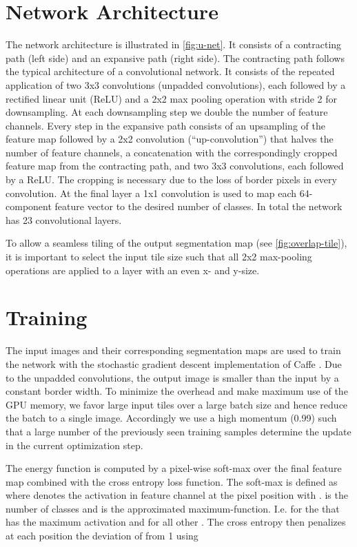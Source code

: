 \documentclass{llncs}
\begin{document}
\section{Network Architecture}
The network architecture is illustrated in \autoref{fig:u-net}. It consists of a contracting path (left side) and an expansive path (right side). The contracting path follows the typical architecture of a convolutional network. It consists of the repeated application of two 3x3 convolutions (unpadded convolutions), each followed by a rectified linear unit (ReLU) and a 2x2 max pooling operation with stride 2 for downsampling. At each downsampling step we double the number of feature channels. Every step in the expansive path consists of an upsampling of the feature map followed by a 2x2 convolution (``up-convolution'') that halves the number of feature channels, a concatenation with the correspondingly cropped feature map from the contracting path, and two 3x3 convolutions, each followed by a ReLU. The cropping is necessary due to the loss of border pixels in every convolution. At the final layer a 1x1 convolution is used to map each 64-component feature vector to the desired number of classes. In total the network has 23 convolutional layers.

To allow a seamless tiling of the output segmentation map (see \autoref{fig:overlap-tile}), it is important to select the input tile size such that all 2x2 max-pooling operations are applied to a layer with an even x- and y-size.

\section{Training}
The input images and their corresponding segmentation maps are used to train the network with the stochastic gradient descent implementation of Caffe \cite{Caffe}.
Due to the unpadded convolutions, the output image is smaller than the input by a constant border width. To minimize the overhead and make maximum use of the GPU memory, we favor large input tiles over a large batch size and hence reduce the batch to a single image. Accordingly we use a high momentum (0.99) such that a large number of the previously seen training samples determine the update in the current optimization step.

The energy function is computed by a pixel-wise soft-max over the final feature map combined with the cross entropy loss function. The soft-max  is defined as 
where  denotes the activation in feature channel  at the pixel position  with .  is the number of classes and  is the approximated maximum-function. I.e.  for the  that has the maximum activation  and  for all other . The cross entropy then penalizes at each position the deviation of  from 1 using
\end{document}
